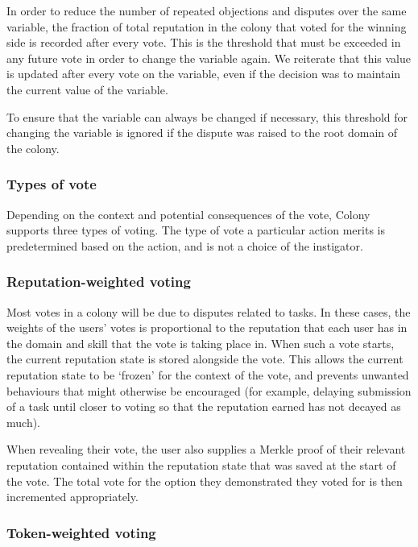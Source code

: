 In order to reduce the number of repeated objections and disputes over the same variable, the fraction of total reputation in the colony that voted for the winning side is recorded after every vote. This is the threshold that must be exceeded in any future vote in order to change the variable again. We reiterate that this value is updated after every vote on the variable, even if the decision was to maintain the current value of the variable.

To ensure that the variable can always be changed if necessary, this threshold for changing the variable is ignored if the dispute was raised to the root domain of the colony.

\subsubsection{Types of vote}

Depending on the context and potential consequences of the vote, Colony supports three types of voting. The type of vote a particular action merits is predetermined based on the action, and is not a choice of the instigator.

\subsubsection*{Reputation-weighted voting}

Most votes in a colony will be due to disputes related to tasks. In these cases, the weights of the users' votes is proportional to the reputation that each user has in the domain and skill that the vote is taking place in. When such a vote starts, the current reputation state is stored alongside the vote. This allows the current reputation state to be `frozen' for the context of the vote, and prevents unwanted behaviours that might otherwise be encouraged (for example, delaying submission of a task until closer to voting so that the reputation earned has not decayed as much).

When revealing their vote, the user also supplies a Merkle proof of their relevant reputation contained within the reputation state that was saved at the start of the vote. The total vote for the option they demonstrated they voted for is then incremented appropriately.

\subsubsection*{Token-weighted voting}


